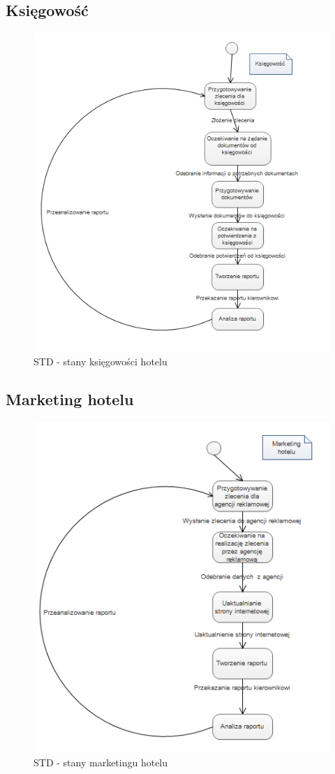 \documentclass[a4paper, 11pt]{article}
\begin{document}
	\subsection{Księgowość}
	\indent
	\begin{figure}[H]%
			\includegraphics[scale=1.0]{Img/STD-kierownik1.png}
			\caption{STD - stany księgowości hotelu}
	\end{figure}
		\subsection{Marketing hotelu}
		\indent
	\begin{figure}[H]%
		\includegraphics[scale=1.0]{Img/STD-kierownik2.png}
		\caption{STD - stany marketingu hotelu}
	\end{figure}
\end{document}
